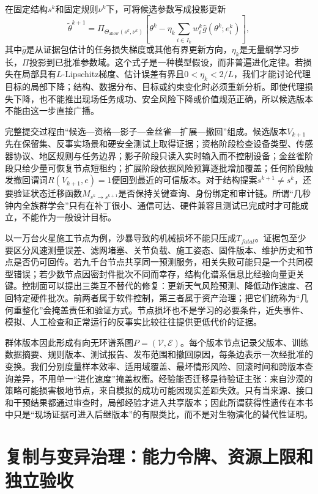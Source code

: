 在固定结构$s^k$和固定规则$\nu^k$下，可将候选参数写成投影更新
\begin{equation}
\widetilde{\theta}^{k+1}=\Pi_{\Theta_{\mathrm{allow}}(s^k,\nu^k)}\!\left[\theta^k-\eta_k\sum_{i\in I_k}w_i^k\widehat{g}(\theta^k;e_i^k)\right],
\end{equation}
其中$\widehat{g}$是从证据包估计的任务损失梯度或其他有界更新方向，$\eta_k$是无量纲学习步长，$\Pi$投影到已批准参数域。这个式子是一种模型假设，而非普遍进化定律。若损失在局部具有$L$-Lipschitz梯度、估计误差有界且$0<\eta_k<2/L$，我们才能讨论代理目标的局部下降；结构、数据分布、目标或约束变化时必须重新分析。即使代理损失下降，也不能推出现场任务成功、安全风险下降或价值规范正确，所以候选版本不能由这一步直接广播。

完整提交过程由“候选—资格—影子—金丝雀—扩展—撤回”组成。候选版本$V_{k+1}$先在保留集、反事实场景和硬安全测试上取得证据；资格阶段检查设备类型、传感器协议、地区规则与任务边界；影子阶段只读入实时输入而不控制设备；金丝雀阶段只给少量可恢复节点短租约；扩展阶段依据风险预算逐批增加覆盖；任何阶段触发撤回谓词$R(V_{k+1},e)=1$便回到最近的可信版本。对于结构提案$s^{k+1}\neq s^k$，还要验证状态迁移函数$M_{s^k\to s^{k+1}}$是否保持关键查询、身份绑定和审计链。所谓“几秒钟内全族群学会”只有在补丁很小、通信可达、硬件兼容且测试已完成时才可能成立，不能作为一般设计目标。

以一万台火星施工节点为例，沙暴导致的机械损坏不能只压成$T_{fatal}$。证据包至少要区分风速测量误差、滤网堵塞、关节负载、施工姿态、固件版本、维护历史和节点是否仍可回传。若九千台节点共享同一预测服务，相关失败可能只是一个共同模型错误；若少数节点因密封件批次不同而幸存，结构化谱系信息比经验向量更关键。控制面可以提出三类互不替代的修复：更新天气风险预测、降低动作速度、召回特定硬件批次。前两者属于软件控制，第三者属于资产治理；把它们统称为“几何重整化”会掩盖责任和验证方式。节点损坏也不是学习的必要条件，近失事件、模拟、人工检查和正常运行的反事实比较往往提供更低代价的证据。

群体版本因此形成有向无环谱系图$P=(\mathcal{V},\mathcal{E})$。每个版本节点记录父版本、训练数据摘要、规则版本、测试报告、发布范围和撤回原因，每条边表示一次经批准的变换。我们分别度量样本效率、适用域覆盖、最坏情形风险、回滚时间和跨版本查询差异，不用单一“进化速度”掩盖权衡。经验能否迁移是待验证主张：来自沙漠的策略可能损害极地节点，来自模拟的成功可能因现实差距失效。只有当来源、接口和干预结果都通过审查时，局部经验才进入共享版本；因此所谓获得性遗传在本书中只是“现场证据可进入后继版本”的有限类比，而不是对生物演化的替代性证明。

\section{复制与变异治理：能力令牌、资源上限和独立验收}
\label{sec:control_engineering}

